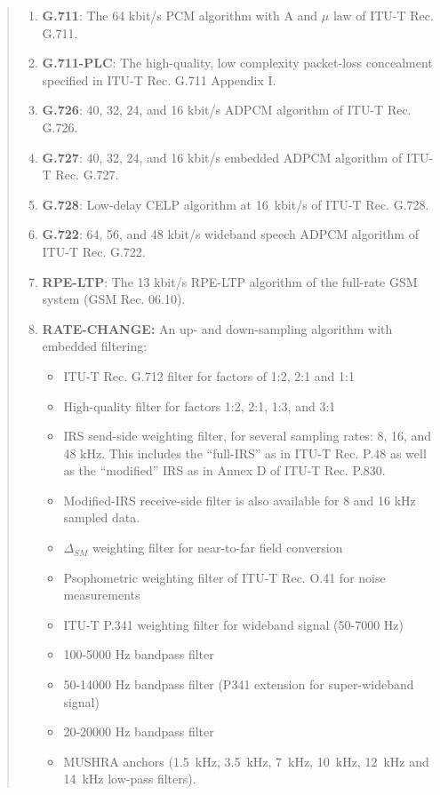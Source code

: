 \begin{quote}
\begin{enumerate}
\item {\bf G.711}: The 64 kbit/s PCM algorithm with A and $\mu$ law of ITU-T Rec. G.711.

\item {\bf G.711-PLC}: The high-quality, low complexity packet-loss concealment specified in ITU-T Rec. G.711 Appendix I.

\item {\bf G.726}: 40, 32, 24, and 16 kbit/s ADPCM algorithm of ITU-T Rec. G.726.

\item {\bf G.727}: 40, 32, 24, and 16 kbit/s embedded ADPCM algorithm of ITU-T Rec. G.727.

\item {\bf G.728}: Low-delay CELP algorithm at 16~kbit/s of ITU-T Rec. G.728.

\item {\bf G.722}: 64, 56, and 48 kbit/s wideband speech ADPCM algorithm of ITU-T Rec. G.722.

\item {\bf RPE-LTP}: The 13 kbit/s RPE-LTP algorithm of the full-rate GSM system (GSM Rec. 06.10).

\item {\bf RATE-CHANGE:} An up- and down-sampling algorithm with embedded filtering:
  \begin{itemize}
  \item ITU-T Rec. G.712 filter for factors of 1:2, 2:1 and 1:1
  \item High-quality filter for factors 1:2, 2:1, 1:3, and 3:1
  \item IRS send-side weighting filter, for several sampling rates: 8, 16, and 48 kHz. This includes the ``full-IRS'' as in ITU-T Rec. P.48 as well as the ``modified'' IRS as in Annex D of ITU-T Rec. P.830.
  \item Modified-IRS receive-side filter is also available for 8 and 16 kHz sampled data.
  \item $\Delta_{SM}$ weighting filter for near-to-far field conversion
  \item Psophometric weighting filter of ITU-T Rec. O.41 for noise measurements
  \item ITU-T P.341 weighting filter for wideband signal (50-7000 Hz)
  \item  100-5000 Hz bandpass filter
  \item  50-14000 Hz bandpass filter (P341 extension for super-wideband signal)
  \item  20-20000 Hz bandpass filter
  \item MUSHRA anchors (1.5~kHz, 3.5~kHz, 7~kHz, 10~kHz, 12~kHz and 14~kHz low-pass filters).
  \end{itemize}


\end{enumerate}
\end{quote}
